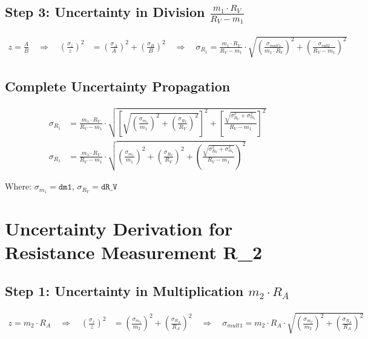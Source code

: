 \documentclass{article} %
\begin{document}
\subsection*{Step 3: Uncertainty in Division $\frac{m_1 \cdot R_V}{R_V - m_1}$}
\begin{align*}
z = \frac{A}{B} \quad \Rightarrow \quad \left(\frac{\sigma_z}{z}\right)^2 &= \left(\frac{\sigma_A}{A}\right)^2 + \left(\frac{\sigma_B}{B}\right)^2 \quad \Rightarrow \quad \sigma_{R_1} = \frac{m_1 \cdot R_V}{R_V - m_1} \cdot \sqrt{\left(\frac{\sigma_{mult1}}{m_1 \cdot R_V}\right)^2 + \left(\frac{\sigma_{sub2}}{R_V - m_1}\right)^2}
\end{align*}

\subsection*{Complete Uncertainty Propagation}
\begin{align*}
\sigma_{R_1} &= \frac{m_1 \cdot R_V}{R_V - m_1} \cdot \sqrt{\left[\sqrt{\left(\frac{\sigma_{m_1}}{m_1}\right)^2 + \left(\frac{\sigma_{R_V}}{R_V}\right)^2}\right]^2 + \left[\frac{\sqrt{\sigma_{R_V}^2 + \sigma_{m_1}^2}}{R_V - m_1}\right]^2} \\
\sigma_{R_1} &= \frac{m_1 \cdot R_V}{R_V - m_1} \cdot \sqrt{\left(\frac{\sigma_{m_1}}{m_1}\right)^2 + \left(\frac{\sigma_{R_V}}{R_V}\right)^2 + \left(\frac{\sqrt{\sigma_{R_V}^2 + \sigma_{m_1}^2}}{R_V - m_1}\right)^2}
\end{align*}

Where: $\sigma_{m_1} = \texttt{dm1}$, $\sigma_{R_V} = \texttt{dR\_V}$

\newpage

\section{Uncertainty Derivation for Resistance Measurement R\_2}
\label{app:e_R2_uncertainty}

\subsection*{Step 1: Uncertainty in Multiplication $m_2 \cdot R_A$}
\begin{align*}
z = m_2 \cdot R_A \quad \Rightarrow \quad \left(\frac{\sigma_z}{z}\right)^2 &= \left(\frac{\sigma_{m_2}}{m_2}\right)^2 + \left(\frac{\sigma_{R_A}}{R_A}\right)^2 \quad \Rightarrow \quad \sigma_{mult1} = m_2 \cdot R_A \cdot \sqrt{\left(\frac{\sigma_{m_2}}{m_2}\right)^2 + \left(\frac{\sigma_{R_A}}{R_A}\right)^2}
\end{align*}
\end{document}
